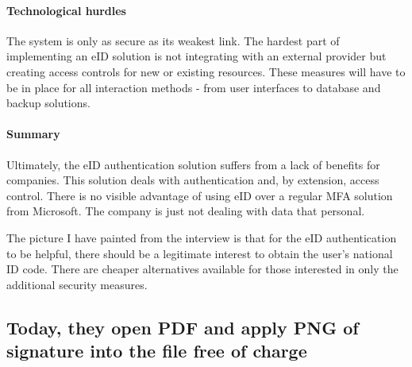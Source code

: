\paragraph{Technological hurdles}

The system is only as secure as its weakest link. The hardest part of implementing an eID solution is not integrating with an external provider but creating access controls for new or existing resources. These measures will have to be in place for all interaction methods - from user interfaces to database and backup solutions.

\paragraph{Summary}

Ultimately, the eID authentication solution suffers from a lack of benefits for companies. This solution deals with authentication and, by extension, access control. There is no visible advantage of using eID over a regular MFA solution from Microsoft. The company is just not dealing with data that personal.

The picture I have painted from the interview is that for the eID authentication to be helpful, there should be a legitimate interest to obtain the user's national ID code. There are cheaper alternatives available for those interested in only the additional security measures.

\subsection{Today, they open PDF and apply PNG of signature into the file free of charge}



